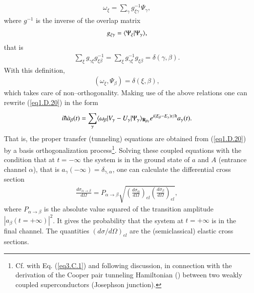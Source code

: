 \begin{subappendices}
\begin{align}
\omega_\xi=\sum_{\gamma}g^{-1}_{\xi\gamma}\Psi_\gamma,
\end{align}
where $g^{-1}$ is the inverse of the overlap matrix
\begin{align}\label{eq1.D.23}
g_{\xi\gamma}=\langle {\Psi_\xi|\Psi_\gamma} \rangle,
\end{align}
that is
\begin{align}\label{eq1.D.24}
\sum_{\xi}g_{\gamma\xi}g^{-1}_{\xi\beta}=\sum_{\xi}^{}g^{-1}_{\gamma\xi}g_{\xi\beta}=\delta(\gamma,\beta).
\end{align}
With this definition,
\begin{align}\label{eq1.D.25}
(\omega_\xi,\Psi_\beta)=\delta(\xi,\beta),
\end{align}
which takes care of non--orthogonality. Making use of the above relations one can rewrite (\ref{eq1.D.20}) in the form
\begin{align}\label{eq1.D.26}
i\hbar \dot a_\beta(t)=\sum_{\gamma}^{}\langle {\omega_\beta|V_\gamma-U_\gamma|\Psi_\gamma} \rangle_{\mathbf R_{\beta\gamma}}e^{i(E_\beta-E_\gamma)t/\hbar}a_\gamma(t).
\end{align}
That is, the proper transfer (tunneling) equations are obtained from (\ref{eq1.D.20}) by a basis orthogonalization process\footnote{Cf. with Eq. (\ref{eq3.C.1}) and following discussion, in connection with the derivation of the Cooper pair tunneling Hamiltonian (\cite{Cohen:62}) between two weakly coupled superconductors (Josephson junction).}. 
  Solving these coupled equations with the condition that at $t=-\infty$ the system is in the ground state of $a$ and $A$ (entrance channel $\alpha$), that is $a_\gamma(-\infty)=\delta_{\gamma,\alpha}$, one can calculate the differential cross section
 \begin{align}\label{eq1.D.27}
 \frac{d\sigma_{\alpha\rightarrow\beta}}{d\Omega}=P_{\alpha\rightarrow\beta}\sqrt{\left(\frac{d\sigma_\alpha}{d\Omega}\right)_{el}\left(\frac{d\sigma_\beta}{d\Omega}\right)_{el}},
 \end{align}
 where $P_{\alpha\rightarrow\beta}$ is the absolute value squared of the transition amplitude $|a_{\beta}(t=+\infty)|^2$. It gives the probability that the system at $t=+\infty$ is in the final channel. The quantities $(d\sigma/d\Omega)_{el}$ are the (semiclassical) elastic cross sections. 
 

\end{subappendices}
